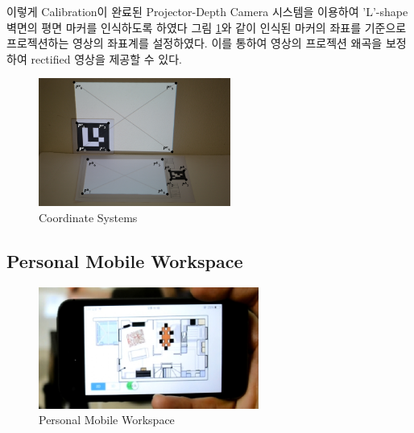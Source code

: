 이렇게 Calibration이 완료된 Projector-Depth Camera 시스템을 이용하여 'L'-shape 벽면의 평면 마커를 인식하도록 하였다 그림 \ref{fig:coordinate}와 같이 인식된 마커\cite{seo_enhancing_2011}의 좌표를 기준으로 프로젝션하는 영상의 좌표계를 설정하였다. 이를 통하여 영상의 프로젝션 왜곡을 보정하여 rectified 영상을 제공할 수 있다. 



\begin{figure}[t!]
\centering
\includegraphics[width=0.8\columnwidth, height=4.2cm]{3-System/coordinates}
\caption{Coordinate Systems}
\label{fig:coordinate}
\end{figure}


\subsection{Personal Mobile Workspace}

\begin{figure}[!b]
\centering
\includegraphics[width=1.0\columnwidth, height=4cm]{3-System/2d}
\caption{Personal Mobile Workspace}
\label{fig:pmw}
\end{figure}

